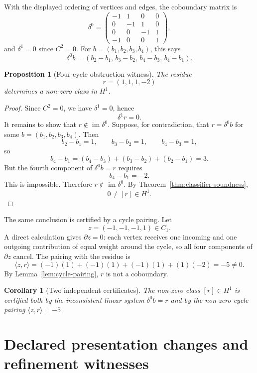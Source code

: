 \documentclass[11pt]{article}
\newtheorem{proposition}[theorem]{Proposition}
\newtheorem{corollary}[theorem]{Corollary}
\newcommand{\im}{\operatorname{im}}
\begin{document}
With the displayed ordering of vertices and edges, the coboundary matrix is
\[
\delta^0=
\begin{pmatrix}
-1&1&0&0\\
0&-1&1&0\\
0&0&-1&1\\
-1&0&0&1
\end{pmatrix},
\]
and \(\delta^1=0\) since \(C^2=0\). For \(b=(b_1,b_2,b_3,b_4)\), this says
\[
\delta^0b=(b_2-b_1,\,b_3-b_2,\,b_4-b_3,\,b_4-b_1).
\]

\begin{proposition}[Four-cycle obstruction witness]\label{prop:nonremovable}
The residue
\[
r=(1,1,1,-2)
\]
determines a non-zero class in \(H^1\).
\end{proposition}

\begin{proof}
Since \(C^2=0\), we have \(\delta^1=0\), hence
\[
\delta^1r=0.
\]
It remains to show that \(r\notin \im\delta^0\). Suppose, for contradiction, that \(r=\delta^0b\) for some \(b=(b_1,b_2,b_3,b_4)\). Then
\[
b_2-b_1=1,
\qquad
b_3-b_2=1,
\qquad
b_4-b_3=1,
\]
so
\[
b_4-b_1
=(b_4-b_3)+(b_3-b_2)+(b_2-b_1)
=3.
\]
But the fourth component of \(\delta^0b=r\) requires
\[
b_4-b_1=-2.
\]
This is impossible. Therefore \(r\notin \im\delta^0\). By Theorem~\ref{thm:classifier-soundness},
\[
0\neq [r]\in H^1.
\]
\end{proof}

The same conclusion is certified by a cycle pairing. Let
\[
z=(-1,-1,-1,1)\in C_1.
\]
A direct calculation gives \(\partial z=0\): each vertex receives one incoming and one outgoing contribution of equal weight around the cycle, so all four components of \(\partial z\) cancel. The pairing with the residue is
\[
\langle z,r\rangle
=(-1)(1)+(-1)(1)+(-1)(1)+(1)(-2)
=-5\neq 0.
\]
By Lemma~\ref{lem:cycle-pairing}, \(r\) is not a coboundary.

\begin{corollary}[Two independent certificates]
The non-zero class \([r]\in H^1\) is certified both by the inconsistent linear system \(\delta^0b=r\) and by the non-zero cycle pairing \(\langle z,r\rangle=-5\).
\end{corollary}

\section{Declared presentation changes and refinement witnesses}
\label{sec:invariance-refinement}
\end{document}
